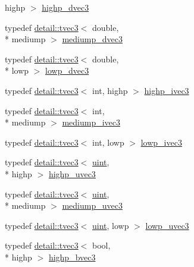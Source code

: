 \begin{DoxyCompactItemize}
highp $>$ \hyperlink{group__core__precision_ga4962711854156dae8ebb4eb39237c542}{highp\-\_\-dvec3}
\item 
typedef \hyperlink{structglm_1_1detail_1_1tvec3}{detail\-::tvec3}$<$ double, \\*
mediump $>$ \hyperlink{group__core__precision_gac051f0702cb0e717db5dd913f6261388}{mediump\-\_\-dvec3}
\item 
typedef \hyperlink{structglm_1_1detail_1_1tvec3}{detail\-::tvec3}$<$ double, \\*
lowp $>$ \hyperlink{group__core__precision_ga9bdb864f7242863e1227e3209f5b2dc4}{lowp\-\_\-dvec3}
\item 
typedef \hyperlink{structglm_1_1detail_1_1tvec3}{detail\-::tvec3}$<$ int, highp $>$ \hyperlink{group__core__precision_gae9f0a321de8ee92dce9d4400362d71e7}{highp\-\_\-ivec3}
\item 
typedef \hyperlink{structglm_1_1detail_1_1tvec3}{detail\-::tvec3}$<$ int, \\*
mediump $>$ \hyperlink{group__core__precision_ga520d24fa0ea887284b80a02c062ca7b8}{mediump\-\_\-ivec3}
\item 
typedef \hyperlink{structglm_1_1detail_1_1tvec3}{detail\-::tvec3}$<$ int, lowp $>$ \hyperlink{group__core__precision_gad133fec5c629e3f712c1270e15144e6c}{lowp\-\_\-ivec3}
\item 
typedef \hyperlink{structglm_1_1detail_1_1tvec3}{detail\-::tvec3}$<$ \hyperlink{group__core__precision_ga4fd29415871152bfb5abd588334147c8}{uint}, \\*
highp $>$ \hyperlink{group__core__precision_ga66d0e4ae1742ede2eb32bf0bfedd7474}{highp\-\_\-uvec3}
\item 
typedef \hyperlink{structglm_1_1detail_1_1tvec3}{detail\-::tvec3}$<$ \hyperlink{group__core__precision_ga4fd29415871152bfb5abd588334147c8}{uint}, \\*
mediump $>$ \hyperlink{group__core__precision_gaebdefe98b08421ef645f65c706af46b2}{mediump\-\_\-uvec3}
\item 
typedef \hyperlink{structglm_1_1detail_1_1tvec3}{detail\-::tvec3}$<$ \hyperlink{group__core__precision_ga4fd29415871152bfb5abd588334147c8}{uint}, lowp $>$ \hyperlink{group__core__precision_ga26fd88e52fe7003d41b0c57c5edffd6e}{lowp\-\_\-uvec3}
\item 
typedef \hyperlink{structglm_1_1detail_1_1tvec3}{detail\-::tvec3}$<$ bool, \\*
highp $>$ \hyperlink{group__core__precision_ga1d77a773fdd024602413670788c10c62}{highp\-\_\-bvec3}
\item 

\end{DoxyCompactItemize}

